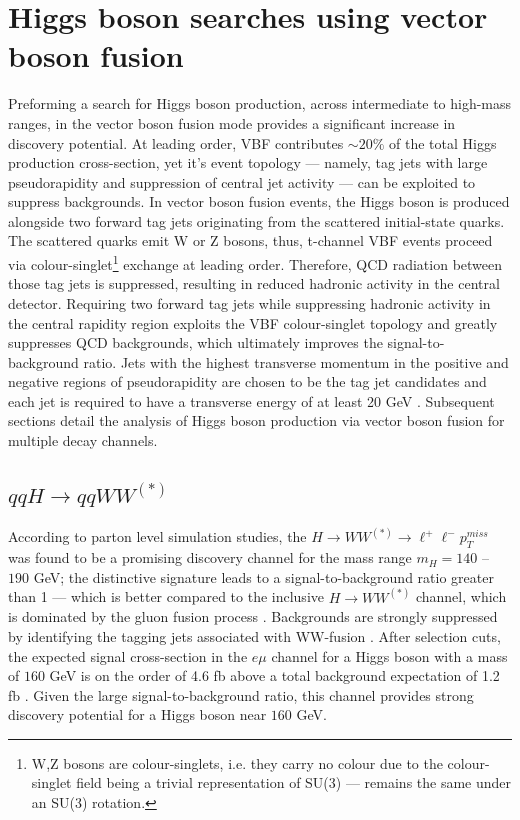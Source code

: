\documentclass[a4paper,11pt]{article}
\begin{document}
\section{Higgs boson searches using vector boson fusion}
Preforming a search for Higgs boson production, across intermediate to high-mass ranges, in the vector boson fusion mode provides a significant increase in discovery potential. At leading order, VBF contributes $\sim 20\%$ of the total Higgs production cross-section, yet it's event topology --- namely, tag jets with large pseudorapidity and suppression of central jet activity --- can be exploited to suppress backgrounds. In vector boson fusion events, the Higgs boson is produced alongside two forward tag jets originating from the scattered initial-state quarks. The scattered quarks emit W or Z bosons, thus, t-channel VBF events proceed via colour-singlet\footnote{W,Z bosons are colour-singlets, i.e. they carry no colour due to the colour-singlet field being a trivial representation of SU(3) --- remains the same under an SU(3) rotation.} exchange at leading order. Therefore, QCD radiation between those tag jets is suppressed, resulting in reduced hadronic activity in the central detector. Requiring two forward tag jets while suppressing  hadronic activity in the central rapidity region exploits the VBF colour-singlet topology and greatly suppresses QCD backgrounds, which ultimately improves the signal-to-background ratio. Jets with the highest transverse momentum in the positive and negative regions of pseudorapidity are chosen to be the tag jet candidates and each jet is required to have a transverse energy of at least 20 GeV \cite{Buescher:2005re}. Subsequent sections detail the analysis of Higgs boson production via vector boson fusion for multiple decay channels.	

\subsection{$qqH \rightarrow qqWW^{(*)}$}
According to parton level simulation studies, the $H \rightarrow WW^{(*)} \rightarrow \ell^+ \ell^- p^{miss}_T $ was found to be a promising discovery channel for the mass range $m_H= 140$ -- $190$ GeV; the distinctive signature leads to a signal-to-background ratio greater than 1 --- which is better compared to the inclusive $H \rightarrow WW^{(*)}$ channel, which is dominated by the gluon fusion process \cite{Buescher:2005re}. Backgrounds are strongly suppressed by identifying the tagging jets associated with WW-fusion \cite{Buttar:2002oza}. After selection cuts,  the expected signal cross-section in the $e\mu$ channel for a Higgs boson with a mass of $160$ GeV is on the order of 4.6 fb above a total background expectation of 1.2 fb \cite{Buescher:2005re}. Given the large signal-to-background ratio, this channel provides strong discovery potential for a Higgs boson near $160$ GeV.\\
\end{document}

